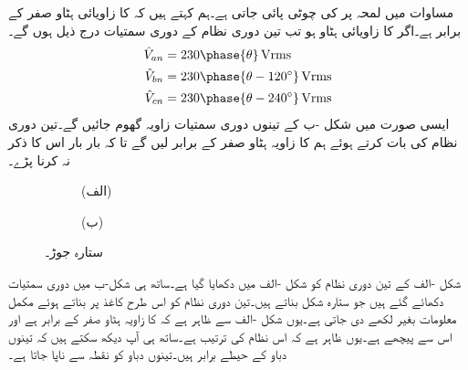 مساوات  میں لمحہ  پر  کی چوٹی پائی جاتی ہے۔ہم کہتے ہیں کہ  کا زاویائی ہٹاو صفر کے برابر ہے۔اگر  کا زاویائی ہٹاو  ہو تب تین دوری نظام کے دوری سمتیات درج ذیل ہوں گے۔
 \begin{gather}
\begin{aligned}
\hat{V}_{an}&=230 \phase{\theta}\,\si{\volt} \rms\\
\hat{V}_{bn}&=230 \phase{\theta-120^{\circ}}\,\si{\volt} \rms\\
\hat{V}_{cn}&=230 \phase{\theta-240^{\circ}}\,\si{\volt} \rms
\end{aligned}
\end{gather}
ایسی صورت میں شکل -ب کے تینوں دوری سمتیات  زاویہ گھوم جائیں گے۔تین دوری  نظام کی بات کرتے ہوئے ہم  کا زاویہ ہٹاو صفر کے برابر لیں گے تا کہ بار بار اس کا ذکر نہ کرنا پڑے۔
\begin{figure}
\centering
\begin{subfigure}{0.5\textwidth}
\centering
{}
\caption*{(الف)}
\end{subfigure}%
\begin{subfigure}{0.5\textwidth}
\centering
{}
\caption*{(ب)}
\end{subfigure}%
\caption{ستارہ جوڑ۔}
\label{شکل_تین_دوری_ستارہ_نظام}
\end{figure}


شکل -الف کے تین دوری  نظام کو شکل -الف میں  دکھایا گیا ہے۔ساتھ ہی شکل-ب میں دوری سمتیات دکھائے گئے ہیں جو ستارہ شکل بناتے ہیں۔تین دوری نظام کو اس طرح کاغذ پر بناتے ہوئے مکمل معلومات بغیر لکھے دی جاتی ہے۔یوں شکل -الف سے ظاہر ہے کہ  کا زاویہ ہٹاو صفر کے برابر ہے اور  اس سے  پیچھے ہے۔یوں ظاہر ہے کہ اس نظام کی ترتیب  ہے۔ساتھ ہی آپ دیکھ سکتے ہیں کہ تینوں دباو کے حیطے برابر ہیں۔تینوں دباو کو نقطہ  سے ناپا جاتا ہے۔

